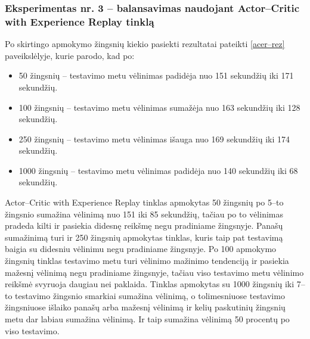 \documentclass{VUMIFPSbakalaurinis}
\begin{document}
\subsubsection{Eksperimentas nr. 3 – balansavimas naudojant Actor–Critic with Experience Replay tinklą}
Po skirtingo apmokymo žingsnių kiekio pasiekti rezultatai pateikti \ref{acer–rez} paveikslėlyje, kurie parodo, kad po:
\begin{itemize}
    \item 50 žingsnių – testavimo metu vėlinimas padidėja nuo 151 sekundžių iki 171 sekundžių. 
    \item 100 žingsnių – testavimo metu vėlinimas sumažėja nuo 163 sekundžių iki 128 sekundžių.
    \item 250 žingsnių – testavimo metu vėlinimas išauga nuo 169 sekundžių iki 174 sekundžių.
    \item 1000 žingsnių – testavimo metu vėlinimas padidėja nuo 140 sekundžių iki 68 sekundžių.
\end{itemize}

Actor–Critic with Experience Replay tinklas apmokytas 50 žingsnių po 5–to žingsnio sumažina vėlinimą nuo 151 iki 85 sekundžių, tačiau po to vėlinimas pradeda kilti ir pasiekia didesnę reikšmę negu pradiniame žingsnyje. Panašų sumažinimą turi ir 250 žingsnių apmokytas tinklas, kuris taip pat testavimą baigia su didesniu vėlinimu negu pradiniame žingsnyje. Po 100 apmokymo žingsnių  tinklas testavimo metu turi vėlinimo mažinimo tendenciją ir pasiekia mažesnį vėlinimą negu pradiniame žingsnyje, tačiau viso testavimo metu vėlinimo reikšmė svyruoja daugiau nei paklaida. Tinklas apmokytas su 1000 žingsnių iki 7–to testavimo žingsnio smarkiai sumažina vėlinimą, o tolimesniuose testavimo žingsniuose išlaiko panašų arba mažesnį vėlinimą ir kelių paskutinių žingsnių metu dar labiau sumažina vėlinimą. Ir taip sumažina vėlinimą 50 procentų po viso testavimo.
\end{document}
